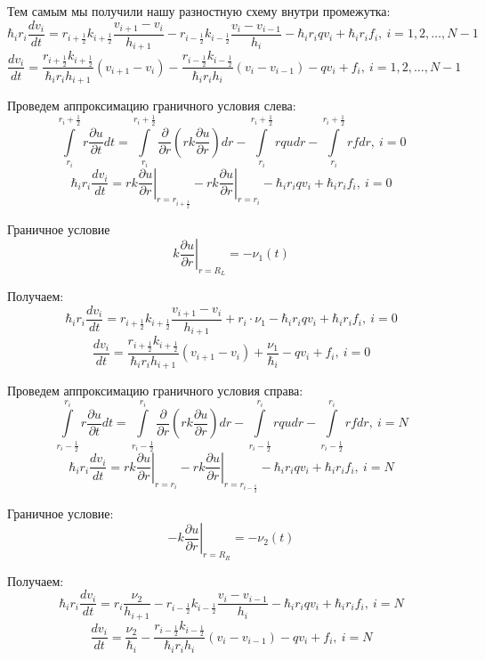 Тем самым мы получили нашу разностную схему внутри промежутка:
\[
  \hbar_i r_i \frac{d v_i}{dt} = r_{i + \frac{1}{2}} k_{i + \frac{1}{2}} \frac{v_{i+1}-v_i}{h_{i + 1}} 
  - r_{i - \frac{1}{2}} k_{i - \frac{1}{2}} \frac{v_{i}-v_{i-1}}{h_{i}} -\hbar_i r_i q v_i + \hbar_i r_i f_i,\ i = 1, 2, \dots, N-1
\]
\[
  \frac{d v_i}{dt} = \frac{r_{i + \frac{1}{2}} k_{i + \frac{1}{2}}}{\hbar_i r_i h_{i + 1}} (v_{i+1}-v_i)
  - \frac{r_{i - \frac{1}{2}} k_{i - \frac{1}{2}}}{\hbar_i r_i h_{i}} (v_{i}-v_{i-1}) - q v_i + f_i,\ i = 1, 2, \dots, N-1
\]

Проведем аппроксимацию граничного условия слева:
\[
  \int\limits^{r_i+\frac{1}{2}}_{r_i} r \frac{\partial u}{\partial t} dt =
  \int\limits^{r_i+\frac{1}{2}}_{r_i} \frac{\partial}{\partial r} \left ( rk\frac{\partial u}{\partial r} \right ) dr
  - \int\limits^{r_i+\frac{1}{2}}_{r_i} rqu dr - \int\limits^{r_i+\frac{1}{2}}_{r_i} rf dr,\ i = 0
\]
\[
  \hbar_i r_i \frac{d v_i}{dt} = \left . rk \frac{\partial u}{\partial r} \right \vert_{r=r_{i+\frac{1}{2}}}
  - \left . rk \frac{\partial u}{\partial r} \right \vert_{r=r_i} -\hbar_i r_i q v_i + \hbar_i r_i f_i,\ i = 0
\]

Граничное условие
\[
  k \left. \frac{\partial u}{\partial r}\right\vert_{r = R_L} = -\nu_1(t)
\]

Получаем:
\[
  \hbar_i r_i \frac{d v_i}{dt} = r_{i + \frac{1}{2}} k_{i + \frac{1}{2}} \frac{v_{i+1}-v_i}{h_{i + 1}} 
  + r_i \cdot \nu_1 - \hbar_i r_i q v_i + \hbar_i r_i f_i,\ i = 0
\]
\[
  \frac{d v_i}{dt} = \frac{r_{i + \frac{1}{2}} k_{i + \frac{1}{2}}}{\hbar_i r_i h_{i + 1}} (v_{i+1}-v_i)
  + \frac{\nu_1}{\hbar_i} - q v_i + f_i,\ i = 0
\]

Проведем аппроксимацию граничного условия справа:
\[
  \int\limits^{r_i}_{r_i-\frac{1}{2}} r \frac{\partial u}{\partial t} dt =
  \int\limits^{r_i}_{r_i-\frac{1}{2}} \frac{\partial}{\partial r} \left ( rk\frac{\partial u}{\partial r} \right ) dr
  - \int\limits^{r_i}_{r_i-\frac{1}{2}} rqu dr - \int\limits^{r_i}_{r_i-\frac{1}{2}} rf dr,\ i = N
\]
\[
  \hbar_i r_i \frac{d v_i}{dt} = \left . rk \frac{\partial u}{\partial r} \right \vert_{r=r_i}
  - \left . rk \frac{\partial u}{\partial r} \right \vert_{r=r_{i-\frac{1}{2}}} -\hbar_i r_i q v_i + \hbar_i r_i f_i,\ i = N
\]

Граничное условие:
\[
  -k \left. \frac{\partial u}{\partial r}\right\vert_{r = R_R} = -\nu_2(t)
\]

Получаем:
\[
  \hbar_i r_i \frac{d v_i}{dt} = r_{i } \frac{\nu_2}{h_{i + 1}} 
  - r_{i - \frac{1}{2}} k_{i - \frac{1}{2}} \frac{v_{i}-v_{i-1}}{h_{i}} -\hbar_i r_i q v_i + \hbar_i r_i f_i,\ i = N
\]
\[
  \frac{d v_i}{dt} = \frac{\nu_2}{\hbar_i}
  - \frac{r_{i - \frac{1}{2}} k_{i - \frac{1}{2}}}{\hbar_i r_i h_{i}} (v_{i}-v_{i-1}) - q v_i + f_i,\ i = N
\]

